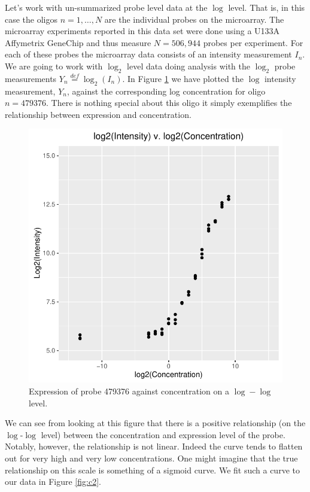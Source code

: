 \documentclass[reqno,12pt,oneside]{report}\usepackage[]{graphicx}\usepackage[]{color}
\makeatletter
\def\maxwidth{ %
  \ifdim\Gin@nat@width>\linewidth
    \linewidth
  \else
    \Gin@nat@width
  \fi
}
\newenvironment{knitrout}{}{} %
\renewenvironment{knitrout}{\begin{small}}{\end{small}}
\theoremstyle{plain}
\theoremstyle{definition}
\theoremstyle{remark}
\numberwithin{theorem}{chapter}     %
\makeatother
\begin{document}
Let's work with un-summarized probe level data at the $\log$ level. That is, in this case the oligos $n=1,\ldots,N$ are the individual probes on the microarray. The microarray experiments reported in this data set were done using a U133A Affymetrix GeneChip and thus measure $N=506,944$ probes per experiment. For each of these probes the microarray data consists of an intensity measurement $I_n$. We are going to work with $\log_2$ level data doing analysis with the $\log_2$ probe measurements $Y_n \overset{def}{=} \log_2(I_n)$. In Figure \ref{fig:c1} we have plotted the $\log$ intensity measurement, $Y_n$, against the corresponding log concentration for oligo $n=479376$. There is nothing special about this oligo it simply exemplifies the relationship between expression and concentration. 

\begin{figure}[ht]
  \centering
\begin{knitrout}
\color{fgcolor}
\includegraphics[width=\maxwidth]{figure/chap4-fig1-1} 

\end{knitrout}
\caption{Expression of probe 479376 against concentration on a $\log-\log$ level.}
  \label{fig:c1}
\end{figure}

We can see from looking at this figure that there is a positive relationship (on the $\log$-$\log$ level) between the concentration and expression level of the probe. Notably, however, the relationship is not linear. Indeed the curve tends to flatten out for very high and very low concentrations. One might imagine that the true relationship on this scale is something of a sigmoid curve. We fit such a curve to our data in Figure \ref{fig:c2}.
\end{document}
